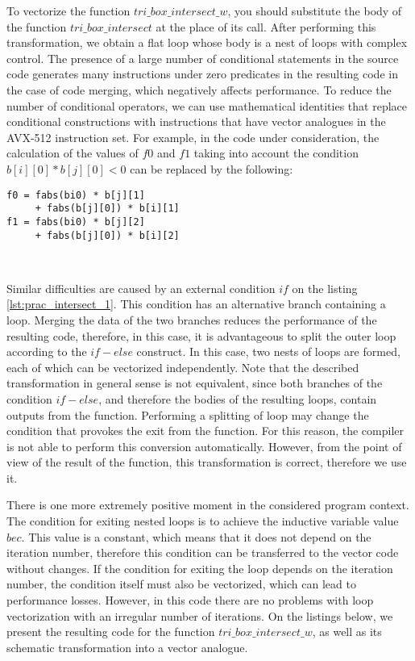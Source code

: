 \documentclass[
11pt,%
tightenlines,%
twoside,%
onecolumn,%
nofloats,%
nobibnotes,%
nofootinbib,%
superscriptaddress,%
noshowpacs,%
centertags]%
{revtex4}
\begin{document}
To vectorize the function $tri\_box\_intersect\_w$, you should substitute the body of the function $tri\_box\_intersect$ at the place of its call.
After performing this transformation, we obtain a flat loop whose body is a nest of loops with complex control.
The presence of a large number of conditional statements in the source code generates many instructions under zero predicates in the resulting code in the case of code merging, which negatively affects performance.
To reduce the number of conditional operators, we can use mathematical identities that replace conditional constructions with instructions that have vector analogues in the AVX-512 instruction set.
For example, in the code under consideration, the calculation of the values of $f0$ and $f1$ taking into account the condition $b[i][0] * b[j][0] < 0$ can be replaced by the following:
\begin{lstlisting}[caption={Using identities to implement vector instructions.},label={lst:prac_intersect_16_2}]
f0 = fabs(bi0) * b[j][1]
     + fabs(b[j][0]) * b[i][1]
f1 = fabs(bi0) * b[j][2]
     + fabs(b[j][0]) * b[i][2]
\end{lstlisting}

\

Similar difficulties are caused by an external condition $if$ on the listing \ref{lst:prac_intersect_1}.
This condition has an alternative branch containing a loop.
Merging the data of the two branches reduces the performance of the resulting code, therefore, in this case, it is advantageous to split the outer loop according to the $if-else$ construct.
In this case, two nests of loops are formed, each of which can be vectorized independently.
Note that the described transformation in general sense is not equivalent, since both branches of the condition $if-else$, and therefore the bodies of the resulting loops, contain outputs from the function.
Performing a splitting of loop may change the condition that provokes the exit from the function.
For this reason, the compiler is not able to perform this conversion automatically.
However, from the point of view of the result of the function, this transformation is correct, therefore we use it.

There is one more extremely positive moment in the considered program context.
The condition for exiting nested loops is to achieve the inductive variable value $bec$.
This value is a constant, which means that it does not depend on the iteration number, therefore this condition can be transferred to the vector code without changes.
If the condition for exiting the loop depends on the iteration number, the condition itself must also be vectorized, which can lead to performance losses.
However, in this code there are no problems with loop vectorization with an irregular number of iterations.
On the listings below, we present the resulting code for the function $tri\_box\_intersect\_w$, as well as its schematic transformation into a vector analogue.
\end{document}
